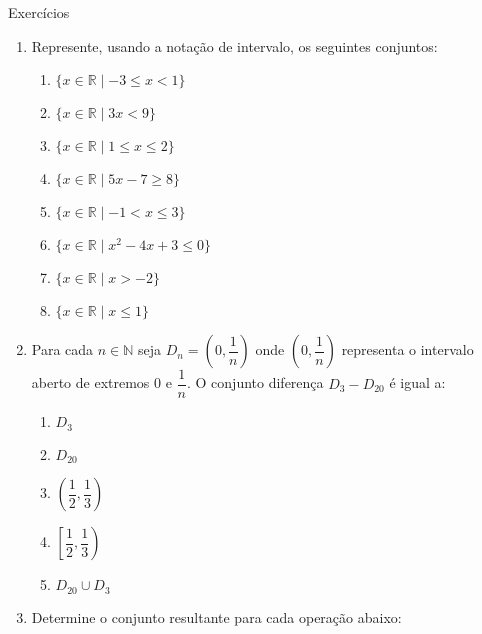 \documentclass[14pt, aspectratio=169]{beamer}
\newcommand{\R}{\mathbb{R}}
\newcommand{\N}{\mathbb{N}}
\begin{document}
\begin{frame}[allowframebreaks]{Exercícios}
\begin{enumerate}
    \vspace{5.0cm}

    \item Represente, usando a notação de intervalo, os seguintes conjuntos:

    \begin{multicols}{2}
        \begin{enumerate}[a]
            \item $\{ x \in \R \mid -3 \leq x < 1 \}$
            \item $\{ x \in \R \mid  3x < 9 \}$
            \item $\{ x \in \R \mid 1 \leq x \leq 2 \}$
            \item $\{ x \in \R \mid 5x - 7 \geq 8 \}$
            \item $\{ x \in \R \mid -1 < x \leq 3 \}$
            \item $\{ x \in \R \mid x^2 - 4x + 3 \leq 0 \}$
            \item $\{ x \in \R \mid x > -2 \}$
            \item $\{ x \in \R \mid x \leq 1 \}$
        \end{enumerate}
    \end{multicols}

    \vspace{5.0cm}

    \item Para cada $n \in \N$ seja $D_n = \left(0, \dfrac{1}{n} \right)$ onde $\left(0, \dfrac{1}{n} \right)$ representa o intervalo aberto de extremos 0 e $\dfrac{1}{n}$. O conjunto diferença $D_3 - D_{20}$ é igual a:

    \begin{multicols}{2}
        \begin{enumerate}[a]
            \item $D_3$
            \item $D_20$
            \item $\left(\dfrac{1}{2}, \dfrac{1}{3} \right)$
            \item $\left[\dfrac{1}{2}, \dfrac{1}{3} \right)$
            \item $D_{20} \cup D_3$
        \end{enumerate}
    \end{multicols}

    \vspace{5.0cm}

    \item Determine o conjunto resultante para cada operação abaixo:


\end{enumerate}
\end{frame}
\end{document}
